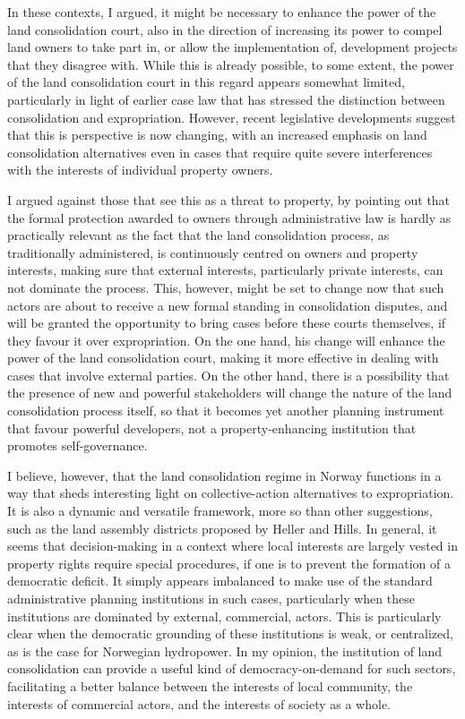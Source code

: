 In these contexts, I argued, it might be necessary to enhance the power of the land consolidation court, also in the direction of increasing its power to compel land owners to take part in, or allow the implementation of, development projects that they disagree with. While this is already possible, to some extent, the power of the land consolidation court in this regard appears somewhat limited, particularly in light of earlier case law that has stressed the distinction between consolidation and expropriation. However, recent legislative developments suggest that this is perspective is now changing, with an increased emphasis on land consolidation alternatives even in cases that require quite severe interferences with the interests of individual property owners.

I argued against those that see this as a threat to property, by pointing out that the formal protection awarded to owners through administrative law is hardly as practically relevant as the fact that the land consolidation process, as traditionally administered, is continuously centred on owners and property interests, making sure that external interests, particularly private interests, can not dominate the process. This, however, might be set to change now that such actors are about to receive a new formal standing in consolidation disputes, and will be granted the opportunity to bring cases before these courts themselves, if they favour it over expropriation. On the one hand, his change will enhance the power of the land consolidation court, making it more effective in dealing with cases that involve external parties. On the other hand, there is a possibility that the presence of new and powerful stakeholders will change the nature of the land consolidation process itself, so that it becomes yet another planning instrument that favour powerful developers, not a property-enhancing institution that promotes self-governance. 

I believe, however, that the land consolidation regime in Norway functions in a way that sheds interesting light on collective-action alternatives to expropriation. It is also a dynamic and versatile framework, more so than other suggestions, such as the land assembly districts proposed by Heller and Hills. In general, it seems that decision-making in a context where local interests are largely vested in property rights require special procedures, if one is to prevent the formation of a democratic deficit. It simply appears imbalanced to make use of the standard administrative planning institutions in such cases, particularly when these institutions are dominated by external, commercial, actors. This is particularly clear when the democratic grounding of these institutions is weak, or centralized, as is the case for Norwegian hydropower. In my opinion, the institution of land consolidation can provide a useful kind of democracy-on-demand for such sectors, facilitating a better balance between the interests of local community, the interests of commercial actors, and the interests of society as a whole.